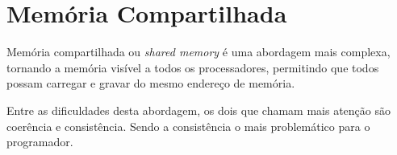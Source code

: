 \section{Memória Compartilhada}

Memória compartilhada ou \textit{shared memory} é uma abordagem mais complexa, 
tornando a memória visível a todos os processadores, permitindo que 
todos possam carregar e gravar do mesmo endereço de memória. 

Entre as dificuldades desta abordagem, os dois que chamam mais atenção são
coerência e consistência.
Sendo a consistência o mais problemático para o programador.






